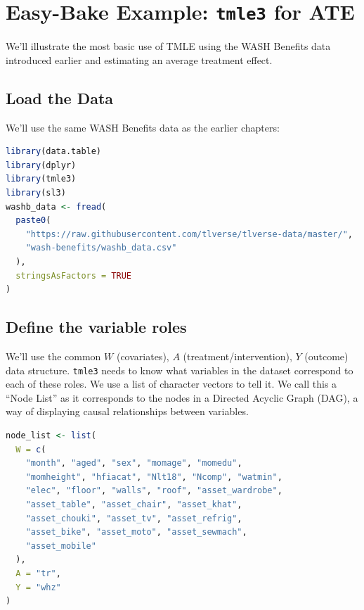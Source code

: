\documentclass[
  12pt, krantz2,
]{krantz}
\newcommand{\passthrough}[1]{#1}
\newcommand{\1}{\mathbbm{1}}
\theoremstyle{definition}
\theoremstyle{definition}
\theoremstyle{definition}
\theoremstyle{definition}
\theoremstyle{remark}
\begin{document}
\hypertarget{easy-bake-example-tmle3-for-ate}{%
\section{\texorpdfstring{Easy-Bake Example: \texttt{tmle3} for ATE}{Easy-Bake Example: tmle3 for ATE}}\label{easy-bake-example-tmle3-for-ate}}

We'll illustrate the most basic use of TMLE using the WASH Benefits data
introduced earlier and estimating an average treatment effect.

\hypertarget{load-the-data-1}{%
\subsection{Load the Data}\label{load-the-data-1}}

We'll use the same WASH Benefits data as the earlier chapters:

\begin{lstlisting}[language=R]
library(data.table)
library(dplyr)
library(tmle3)
library(sl3)
washb_data <- fread(
  paste0(
    "https://raw.githubusercontent.com/tlverse/tlverse-data/master/",
    "wash-benefits/washb_data.csv"
  ),
  stringsAsFactors = TRUE
)
\end{lstlisting}

\hypertarget{define-the-variable-roles}{%
\subsection{Define the variable roles}\label{define-the-variable-roles}}

We'll use the common \(W\) (covariates), \(A\) (treatment/intervention), \(Y\)
(outcome) data structure. \passthrough{\lstinline!tmle3!} needs to know what variables in the dataset
correspond to each of these roles. We use a list of character vectors to tell
it. We call this a ``Node List'' as it corresponds to the nodes in a Directed
Acyclic Graph (DAG), a way of displaying causal relationships between variables.

\begin{lstlisting}[language=R]
node_list <- list(
  W = c(
    "month", "aged", "sex", "momage", "momedu",
    "momheight", "hfiacat", "Nlt18", "Ncomp", "watmin",
    "elec", "floor", "walls", "roof", "asset_wardrobe",
    "asset_table", "asset_chair", "asset_khat",
    "asset_chouki", "asset_tv", "asset_refrig",
    "asset_bike", "asset_moto", "asset_sewmach",
    "asset_mobile"
  ),
  A = "tr",
  Y = "whz"
)
\end{lstlisting}
\end{document}
